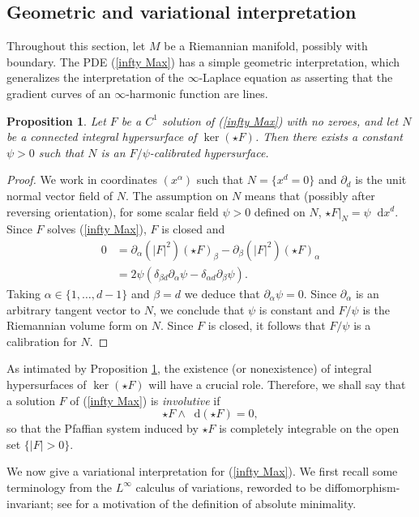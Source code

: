\documentclass[reqno,11pt]{amsart}
\newcommand*\dif{\mathop{}\!\mathrm{d}}
\newcommand{\dfn}[1]{\emph{#1}\index{#1}}
\newtheorem{proposition}[theorem]{Proposition}
\theoremstyle{definition}
\numberwithin{equation}{section}
\begin{document}
\subsection{Geometric and variational interpretation}\label{EL interpretation}
Throughout this section, let $M$ be a Riemannian manifold, possibly with boundary.
The PDE (\ref{infty Max}) has a simple geometric interpretation, which generalizes the interpretation of the $\infty$-Laplace equation as asserting that the gradient curves of an $\infty$-harmonic function are lines.

\begin{proposition}\label{infty Max calibrates}
Let $F$ be a $C^1$ solution of (\ref{infty Max}) with no zeroes, and let $N$ be a connected integral hypersurface of $\ker(\star F)$.
Then there exists a constant $\psi > 0$ such that $N$ is an $F/\psi$-calibrated hypersurface.
\end{proposition}
\begin{proof}
We work in coordinates $(x^\alpha)$ such that $N = \{x^d = 0\}$ and $\partial_d$ is the unit normal vector field of $N$.
The assumption on $N$ means that (possibly after reversing orientation), for some scalar field $\psi > 0$ defined on $N$, $\star F|_N = \psi \dif x^d$.
Since $F$ solves (\ref{infty Max}), $F$ is closed and
\begin{align*}
0 
&= \partial_\alpha(|F|^2)(\star F)_\beta - \partial_\beta(|F|^2)(\star F)_\alpha \\
&= 2\psi(\delta_{\beta d} \partial_\alpha \psi - \delta_{\alpha d} \partial_\beta \psi).
\end{align*}
Taking $\alpha \in \{1, \dots, d - 1\}$ and $\beta = d$ we deduce that $\partial_\alpha \psi = 0$.
Since $\partial_\alpha$ is an arbitrary tangent vector to $N$, we conclude that $\psi$ is constant and $F/\psi$ is the Riemannian volume form on $N$.
Since $F$ is closed, it follows that $F/\psi$ is a calibration for $N$.
\end{proof}

As intimated by Proposition \ref{infty Max calibrates}, the existence (or nonexistence) of integral hypersurfaces of $\ker(\star F)$ will have a crucial role.
Therefore, we shall say that a solution $F$ of (\ref{infty Max}) is \dfn{involutive} if 
$$\star F \wedge \dif(\star F) = 0,$$
so that the Pfaffian system induced by $\star F$ is completely integrable on the open set $\{|F| > 0\}$.

We now give a variational interpretation for (\ref{infty Max}).
We first recall some terminology from the $L^\infty$ calculus of variations, reworded to be diffomorphism-invariant; see \cite[\S5]{Barron08} for a motivation of the definition of absolute minimality.
\end{document}
